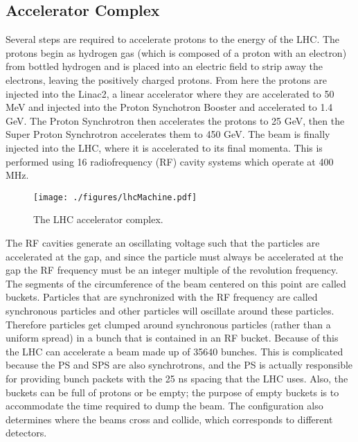 \subsection{Accelerator Complex}

Several steps are required to accelerate protons to the energy of the LHC.  The protons begin as hydrogen gas (which is composed of a proton with an electron) from bottled hydrogen and is placed into an electric field to strip away the electrons, leaving the positively charged protons.  From here the protons are injected into the Linac2, a linear accelerator where they are accelerated to 50 MeV and injected into the Proton Synchotron Booster and accelerated to 1.4 GeV.  The Proton Synchrotron then accelerates the protons to 25 GeV, then the Super Proton Synchrotron accelerates them to 450 GeV.  The beam is finally injected into the LHC, where it is accelerated to its final momenta.  This is performed using 16 radiofrequency (RF) cavity systems which operate at 400 MHz.  \\

\begin{figure}[h!]
  \centering
	\texttt{[image: ./figures/lhcMachine.pdf]}
\caption{\label{fig:lhcMachine}{ The LHC accelerator complex. }}
\end{figure}

The RF cavities generate an oscillating voltage such that the particles are accelerated at the gap, and since the particle must always be accelerated at the gap the RF frequency must be an integer multiple of the revolution frequency.  The segments of the circumference of the beam centered on this point are called buckets.  Particles that are synchronized with the RF frequency are called synchronous particles and other particles will oscillate around these particles.  Therefore particles get clumped around synchronous particles (rather than a uniform spread) in a bunch that is contained in an RF bucket.  Because of this the LHC can accelerate a beam made up of 35640 bunches.  This is complicated because the PS and SPS are also synchrotrons, and the PS is actually responsible for providing bunch packets with the 25 ns spacing that the LHC uses.  Also, the buckets can be full of protons or be empty; the purpose of empty buckets is to accommodate the time required to dump the beam.  The configuration also determines where the beams cross and collide, which corresponds to different detectors.   \\ %

